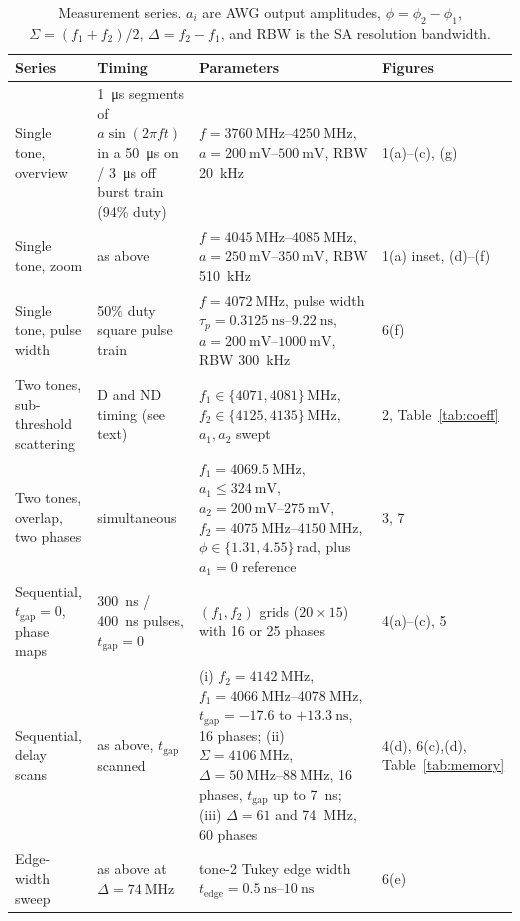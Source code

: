 \documentclass[aps,prb,reprint,superscriptaddress,floatfix]{revtex4-2}
\newcommand{\tgap}{t_{\mathrm{gap}}}
\begin{document}
\begin{table}[t]
\caption{Measurement series. $a_i$ are AWG output amplitudes, $\phi=\phi_2-\phi_1$, $\Sigma=(f_1+f_2)/2$, $\Delta=f_2-f_1$, and RBW is the SA resolution bandwidth.}
\label{tab:series}
\begin{ruledtabular}
\begin{tabular}{p{3.1cm}p{5.1cm}p{6.8cm}p{2.0cm}}
Series & Timing & Parameters & Figures\\
\hline
Single tone, overview & \SI{1}{\micro\second} segments of $a\sin(2\pi ft)$ in a \SI{50}{\micro\second} on / \SI{3}{\micro\second} off burst train (94\% duty) & $f=\SIrange{3760}{4250}{\mega\hertz}$, $a=\SIrange{200}{500}{\milli\volt}$, RBW \SI{20}{\kilo\hertz} & 1(a)--(c), (g)\\
Single tone, zoom & as above & $f=\SIrange{4045}{4085}{\mega\hertz}$, $a=\SIrange{250}{350}{\milli\volt}$, RBW \SI{510}{\kilo\hertz} & 1(a) inset, (d)--(f)\\
Single tone, pulse width & 50\% duty square pulse train & $f=\SI{4072}{\mega\hertz}$, pulse width $\tau_p=\SIrange{0.3125}{9.22}{\nano\second}$, $a=\SIrange{200}{1000}{\milli\volt}$, RBW \SI{300}{\kilo\hertz} & 6(f)\\
Two tones, sub-threshold scattering & D and ND timing (see text) & $f_1\in\{4071,4081\}$\,MHz, $f_2\in\{4125,4135\}$\,MHz, $a_1,a_2$ swept & 2, Table~\ref{tab:coeff}\\
Two tones, overlap, two phases & simultaneous & $f_1=\SI{4069.5}{\mega\hertz}$, $a_1\le\SI{324}{\milli\volt}$, $a_2=\SIrange{200}{275}{\milli\volt}$, $f_2=\SIrange{4075}{4150}{\mega\hertz}$, $\phi\in\{1.31,4.55\}$\,rad, plus $a_1=0$ reference & 3, 7\\
Sequential, $\tgap=0$, phase maps & \SI{300}{\nano\second} / \SI{400}{\nano\second} pulses, $\tgap=0$ & $(f_1,f_2)$ grids ($20\times15$) with 16 or 25 phases & 4(a)--(c), 5\\
Sequential, delay scans & as above, $\tgap$ scanned & (i) $f_2=\SI{4142}{\mega\hertz}$, $f_1=\SIrange{4066}{4078}{\mega\hertz}$, $\tgap=-17.6$ to $+\SI{13.3}{\nano\second}$, 16 phases; (ii) $\Sigma=\SI{4106}{\mega\hertz}$, $\Delta=\SIrange{50}{88}{\mega\hertz}$, 16 phases, $\tgap$ up to \SI{7}{\nano\second}; (iii) $\Delta=61$ and \SI{74}{\mega\hertz}, 60 phases & 4(d), 6(c),(d), Table~\ref{tab:memory}\\
Edge-width sweep & as above at $\Delta=\SI{74}{\mega\hertz}$ & tone-2 Tukey edge width $t_{\mathrm{edge}}=\SIrange{0.5}{10}{\nano\second}$ & 6(e)\\
\end{tabular}
\end{ruledtabular}
\end{table}
\end{document}
